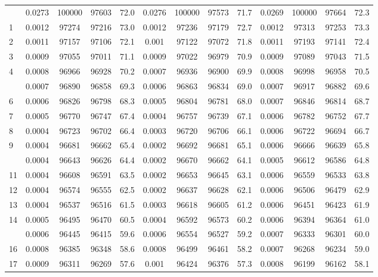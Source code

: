 \documentclass[
  14pt,
]{article}
\begin{document}
\begin{longtable}[t]{lcccccccccccc}
\endfoot
\bottomrule
\endlastfoot
0 & 0.0273 & 100000 & 97603 & 72.0 & 0.0276 & 100000 & 97573 & 71.7 & 0.0269 & 100000 & 97664 & 72.3\\
1 & 0.0012 & 97274 & 97216 & 73.0 & 0.0012 & 97236 & 97179 & 72.7 & 0.0012 & 97313 & 97253 & 73.3\\
2 & 0.0011 & 97157 & 97106 & 72.1 & 0.001 & 97122 & 97072 & 71.8 & 0.0011 & 97193 & 97141 & 72.4\\
3 & 0.0009 & 97055 & 97011 & 71.1 & 0.0009 & 97022 & 96979 & 70.9 & 0.0009 & 97089 & 97043 & 71.5\\
4 & 0.0008 & 96966 & 96928 & 70.2 & 0.0007 & 96936 & 96900 & 69.9 & 0.0008 & 96998 & 96958 & 70.5\\
\addlinespace
5 & 0.0007 & 96890 & 96858 & 69.3 & 0.0006 & 96863 & 96834 & 69.0 & 0.0007 & 96917 & 96882 & 69.6\\
6 & 0.0006 & 96826 & 96798 & 68.3 & 0.0005 & 96804 & 96781 & 68.0 & 0.0007 & 96846 & 96814 & 68.7\\
7 & 0.0005 & 96770 & 96747 & 67.4 & 0.0004 & 96757 & 96739 & 67.1 & 0.0006 & 96782 & 96752 & 67.7\\
8 & 0.0004 & 96723 & 96702 & 66.4 & 0.0003 & 96720 & 96706 & 66.1 & 0.0006 & 96722 & 96694 & 66.7\\
9 & 0.0004 & 96681 & 96662 & 65.4 & 0.0002 & 96692 & 96681 & 65.1 & 0.0006 & 96666 & 96639 & 65.8\\
\addlinespace
10 & 0.0004 & 96643 & 96626 & 64.4 & 0.0002 & 96670 & 96662 & 64.1 & 0.0005 & 96612 & 96586 & 64.8\\
11 & 0.0004 & 96608 & 96591 & 63.5 & 0.0002 & 96653 & 96645 & 63.1 & 0.0006 & 96559 & 96533 & 63.8\\
12 & 0.0004 & 96574 & 96555 & 62.5 & 0.0002 & 96637 & 96628 & 62.1 & 0.0006 & 96506 & 96479 & 62.9\\
13 & 0.0004 & 96537 & 96516 & 61.5 & 0.0003 & 96618 & 96605 & 61.2 & 0.0006 & 96451 & 96423 & 61.9\\
14 & 0.0005 & 96495 & 96470 & 60.5 & 0.0004 & 96592 & 96573 & 60.2 & 0.0006 & 96394 & 96364 & 61.0\\
\addlinespace
15 & 0.0006 & 96445 & 96415 & 59.6 & 0.0006 & 96554 & 96527 & 59.2 & 0.0007 & 96333 & 96301 & 60.0\\
16 & 0.0008 & 96385 & 96348 & 58.6 & 0.0008 & 96499 & 96461 & 58.2 & 0.0007 & 96268 & 96234 & 59.0\\
17 & 0.0009 & 96311 & 96269 & 57.6 & 0.001 & 96424 & 96376 & 57.3 & 0.0008 & 96199 & 96162 & 58.1\\

\end{longtable}
\end{document}
